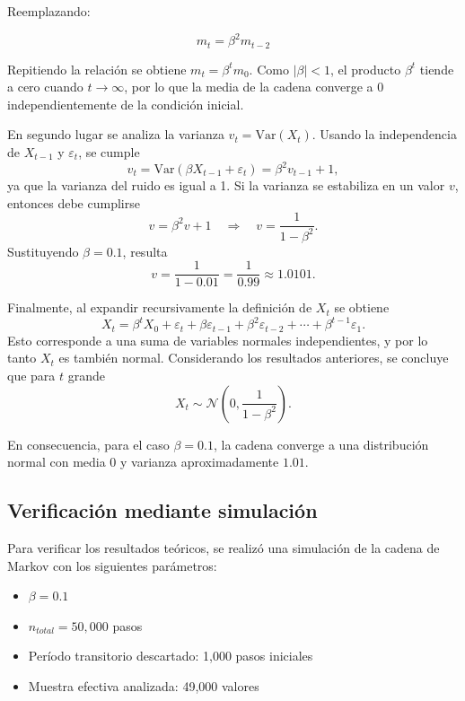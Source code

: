 \documentclass[12pt,a4paper]{article}
\begin{document}
Reemplazando:

\begin{equation*}
    m_{t} = \beta^2 m_{t-2}
\end{equation*}

Repitiendo la relación se obtiene $m_t = \beta^t m_0$. Como $|\beta| < 1$, el producto $\beta^t$ tiende a cero cuando $t \to \infty$, por lo que la media de la cadena converge a 0 independientemente de la condición inicial.

En segundo lugar se analiza la varianza $v_t = \mathrm{Var}(X_t)$. Usando la independencia de $X_{t-1}$ y $\varepsilon_t$, se cumple
\begin{equation*}
    v_t = \mathrm{Var}(\beta X_{t-1} + \varepsilon_t) = \beta^2 v_{t-1} + 1,
\end{equation*}
ya que la varianza del ruido es igual a 1. Si la varianza se estabiliza en un valor $v$, entonces debe cumplirse
\begin{equation*}
    v = \beta^2 v + 1 \quad \Longrightarrow \quad v = \frac{1}{1-\beta^2}.
\end{equation*}
Sustituyendo $\beta = 0.1$, resulta
\begin{equation*}
    v = \frac{1}{1-0.01} = \frac{1}{0.99} \approx 1.0101.
\end{equation*}

Finalmente, al expandir recursivamente la definición de $X_t$ se obtiene
\begin{equation*}
    X_t = \beta^t X_0 + \varepsilon_t + \beta \varepsilon_{t-1} + \beta^2 \varepsilon_{t-2} + \cdots + \beta^{t-1}\varepsilon_{1}.
\end{equation*}
Esto corresponde a una suma de variables normales independientes, y por lo tanto $X_t$ es también normal. Considerando los resultados anteriores, se concluye que para $t$ grande
\begin{equation*}
    X_t \sim \mathcal{N}\left(0, \frac{1}{1-\beta^2}\right).
\end{equation*}

En consecuencia, para el caso $\beta = 0.1$, la cadena converge a una distribución normal con media 0 y varianza aproximadamente $1.01$.

\subsection*{Verificación mediante simulación}

Para verificar los resultados teóricos, se realizó una simulación de la cadena de Markov con los siguientes parámetros:
\begin{itemize}
    \item $\beta = 0.1$
    \item $n_{total} = 50,000$ pasos
    \item Período transitorio descartado: 1,000 pasos iniciales
    \item Muestra efectiva analizada: 49,000 valores
\end{itemize}
\end{document}
